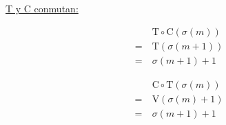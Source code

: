 		 \underline{T y C conmutan:}
		 \vspace*{-2\bigskipamount}
		\begin{multicols}{2}
			\begin{align*}
			&\ \text{T}\circ\text{C}(\sigma(m))\\
			=&\ \text{T}(\sigma(m+1))\\
			=&\ \sigma(m+1)+1
			\end{align*}
			
			\begin{align*}
			&\ \text{C}\circ\text{T}(\sigma(m))\\
			=&\ \text{V}(\sigma(m)+1)\\
			=&\ \sigma(m+1)+1
			\end{align*}
		\end{multicols}